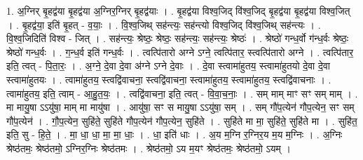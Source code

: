 \documentclass[17pt]{extarticle}
\begin{document}
1. अ॒ग्निर् बृ॒हद्व॑या बृ॒हद्व॑या अ॒ग्निर॒ग्निर् बृ॒हद्व॑याः । . बृ॒हद्व॑या विश्व॒जिद् वि॑श्व॒जिद् बृ॒हद्व॑या बृ॒हद्व॑या विश्व॒जित् । . बृ॒हद्व॑या॒ इति॑ बृ॒हत् - व॒याः॒ । . वि॒श्व॒जिथ् सह॑न्त्यः॒ सह॑न्त्यो विश्व॒जिद् वि॑श्व॒जिथ् सह॑न्त्यः । . वि॒श्व॒जिदिति॑ विश्व - जित् । . सह॑न्त्यः॒ श्रेष्ठः॒ श्रेष्ठः॒ सह॑न्त्यः॒ सह॑न्त्यः॒ श्रेष्ठः॑ । . श्रेष्ठो॑ गन्ध॒र्वो ग॑न्ध॒र्वः श्रेष्ठः॒ श्रेष्ठो॑ गन्ध॒र्वः । . ग॒न्ध॒र्व इति॑ गन्ध॒र्वः । . त्वत्पि॑तारो अग्ने ऽग्ने॒ त्वत्पि॑तार॒ स्त्वत्पि॑तारो अग्ने । . त्वत्पि॑तार॒ इति॒ त्वत् - पि॒ता॒रः॒ । . अ॒ग्ने॒ दे॒वा दे॒वा अ॑ग्ने ऽग्ने दे॒वाः । . दे॒वा स्त्वामा॑हुतय॒ स्त्वामा॑हुतयो दे॒वा दे॒वा स्त्वामा॑हुतयः । . त्वामा॑हुतय॒ स्त्वद्वि॑वाचना॒ स्त्वद्वि॑वाचना॒ स्त्वामा॑हुतय॒ स्त्वामा॑हुतय॒ स्त्वद्वि॑वाचनाः । . त्वामा॑हुतय॒ इति॒ त्वाम् - आ॒हु॒त॒यः॒ । . त्वद्वि॑वाचना॒ इति॒ त्वत् - वि॒वा॒च॒नाः॒ । . सम् माम् माꣳ सꣳ सम् माम् । . मा मायु॒षा ऽऽयु॑षा॒ माम् मा मायु॑षा । . आयु॑षा॒ सꣳ स मायु॒षा ऽऽयु॑षा॒ सम् । . सम् गौ॑प॒त्येन॑ गौप॒त्येन॒ सꣳ सम् गौ॑प॒त्येन॑ । . गौ॒प॒त्येन॒ सुहि॑ते॒ सुहि॑ते गौप॒त्येन॑ गौप॒त्येन॒ सुहि॑ते । . सुहि॑ते मा मा॒ सुहि॑ते॒ सुहि॑ते मा । . सुहि॑त॒ इति॒ सु - हि॒ते॒ । . मा॒ धा॒ धा॒ मा॒ मा॒ धाः॒ । . धा॒ इति॑ धाः । . अ॒य म॒ग्नि र॒ग्निर॒य म॒य म॒ग्निः । . अ॒ग्निः श्रेष्ठ॑तमः॒ श्रेष्ठ॑तमो॒ ऽग्निर॒ग्निः श्रेष्ठ॑तमः । . श्रेष्ठ॑तमो॒ ऽय म॒यꣳ श्रेष्ठ॑तमः॒ श्रेष्ठ॑तमो॒ ऽयम् । \newline
\end{document}
